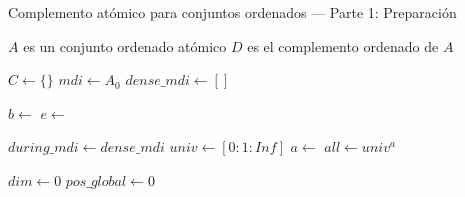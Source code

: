 \begin{algorithm}
\caption{Complemento atómico para conjuntos ordenados — Parte 1: Preparación}\label{alg:complementAtom-part1}
\begin{algorithmic}[1]
\Require $A$ es un conjunto ordenado atómico
\Ensure $D$ es el complemento ordenado de $A$

  \State $C \gets \{\}$  
  \State $mdi \gets A_0$  
  \State $dense\_mdi \gets []$

    \State $b \gets$ 
    \State $e \gets$ 
    \State {}
  \EndFor

  \State $during\_mdi \gets dense\_mdi$
  \State $univ \gets [0:1:Inf]$
  \State $a \gets$ 
  \State $all \gets univ^a$ 

  \State $dim \gets 0$
  \State $pos\_global \gets 0$
\EndFunction
\end{algorithmic}
\end{algorithm}

